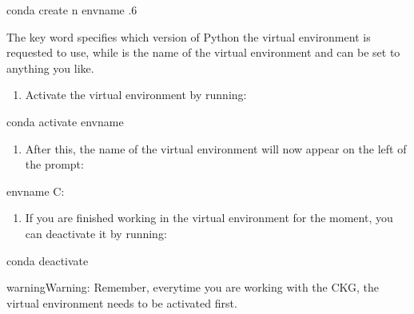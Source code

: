 \documentclass[letterpaper,10pt,english]{sphinxmanual}
\begin{document}
\begin{sphinxVerbatim}[commandchars=\\\{\}]
\PYGZgt{} conda create \PYGZhy{}n env\PYGZus{}name .6
\end{sphinxVerbatim}

The key word  specifies which version of Python the virtual environment is requested to use, while  is the name of the virtual environment and can be set to anything you like.
\begin{enumerate}
%
\setcounter{enumi}{1}
\item {} 
Activate the virtual environment by running:

\end{enumerate}

\begin{sphinxVerbatim}[commandchars=\\\{\}]
\PYGZgt{} conda activate env\PYGZus{}name
\end{sphinxVerbatim}
\begin{enumerate}
%
\setcounter{enumi}{2}
\item {} 
After this, the name of the virtual environment will now appear on the left of the prompt:

\end{enumerate}

\begin{sphinxVerbatim}[commandchars=\\\{\}]
env\PYGZus{}name C:
\end{sphinxVerbatim}
\begin{enumerate}
%
\setcounter{enumi}{3}
\item {} 
If you are finished working in the virtual environment for the moment, you can deactivate it by running:

\end{enumerate}

\begin{sphinxVerbatim}[commandchars=\\\{\}]
\PYGZgt{} conda deactivate
\end{sphinxVerbatim}

\begin{sphinxadmonition}{warning}{Warning:}
Remember, everytime you are working with the CKG, the virtual environment needs to be activated first.
\end{sphinxadmonition}
\end{document}
